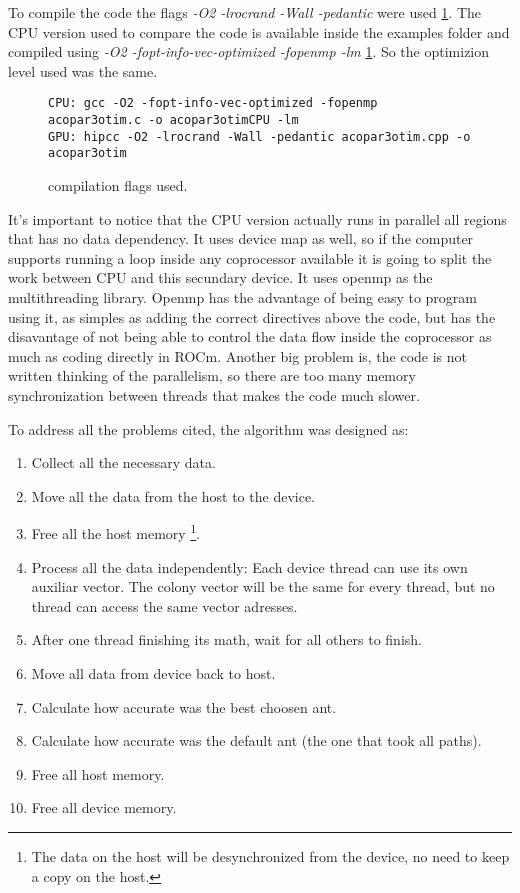 To compile the code the flags \emph{-O2 -lrocrand -Wall -pedantic} were used \ref{fig:code5}.
The CPU version used to compare the code is available inside the examples folder and compiled
using \emph{-O2 -fopt-info-vec-optimized -fopenmp -lm} \ref{fig:code5}. So the optimizion level used
was the same.

\begin{figure}[h!]
\begin{lstlisting}
CPU: gcc -O2 -fopt-info-vec-optimized -fopenmp acopar3otim.c -o acopar3otimCPU -lm
GPU: hipcc -O2 -lrocrand -Wall -pedantic acopar3otim.cpp -o acopar3otim
\end{lstlisting}
\caption{compilation flags used.}
\label{fig:code5}
\end{figure}

It's important to notice that the CPU version actually runs in parallel all
regions that has no data dependency. It uses device map as well, so if the computer
supports running a loop inside any coprocessor available it is going to split the work between CPU and this
secundary device.
It uses openmp as the multithreading library. Openmp has the advantage of being easy
to program using it, as simples as adding the correct directives above the code, but
has the disavantage of not being able to control the data flow inside the coprocessor as much
as coding directly in ROCm. Another big problem is, the code is not written thinking
of the parallelism, so there are too many memory synchronization between threads
that makes the code much slower.

To address all the problems cited, the algorithm was designed as:

\begin{enumerate}
    \item Collect all the necessary data.
    \item Move all the data from the host to the device.
    \item Free all the host memory \footnote{The data on the host will be desynchronized from the device, no need to keep a copy on the host.}.
    \item Process all the data independently:
    \subitem Each device thread can use its own auxiliar vector.
    \subitem The colony vector will be the same for every thread, but no thread can access the same vector adresses.
    \item After one thread finishing its math, wait for all others to finish.
    \item Move all data from device back to host.
    \item Calculate how accurate was the best choosen ant.
    \item Calculate how accurate was the default ant (the one that took all paths).
    \item Free all host memory.
    \item Free all device memory.
\end{enumerate}
